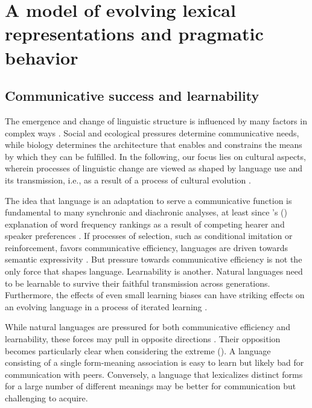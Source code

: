 \documentclass[a4paper, 11pt]{article}
\theoremstyle{Satz}
\newcommand{\citeposs}[2][]{\citeauthor{#2}'s (\citeyear[#1]{#2})}
\begin{document}
\section{A model of evolving lexical representations and pragmatic behavior}
\label{sec:model}

\subsection{Communicative success and learnability}

The emergence and change of linguistic structure is influenced by many factors in complex ways
\citep{benz+etal:2005b,steels:2011,tamariz+kirby:2016}. Social and ecological pressures
determine communicative needs, while biology determines the architecture that enables and
constrains the means by which they can be fulfilled. In the following, our focus lies on
cultural aspects, wherein processes of linguistic change are viewed as shaped by language use
and its transmission, i.e., as a result of a process of cultural evolution
\citep{Pagel2009:Human-Language-,ThompsonKirby2016:Culture-Shapes-}.

The idea that language is an adaptation to serve a communicative function is fundamental to
many synchronic and diachronic analyses, at least since \citeposs{zipf:1949} explanation of
word frequency rankings as a result of competing hearer and speaker preferences \citep[e.g.,
in][]{martinet:1962, horn:1984,jaeger+vRooij:2007,jaeger:2007,
  piantadosi:2014,kirby+etal:2015}. If processes of selection, such as conditional imitation or
reinforcement, favors communicative efficiency, languages are driven towards semantic
expressivity \citep[e.g.,][]{nowak+krakauer:1999,Skyrms2010:Signals}. But pressure towards
communicative efficiency is not the only force that shapes language. Learnability is another.
Natural languages need to be learnable to survive their faithful transmission across
generations. Furthermore, the effects of even small learning biases can have striking effects
on an evolving language in a process of iterated learning
\citep{KirbyHurford2002:The-Emergence-o,SmithKirby2003:Iterated-Learni,kirby+etal:2014}.

While natural languages are pressured for both communicative efficiency and learnability, these forces may
pull in opposite directions \citep[\S7]{christiansen+chater:2008}. Their opposition becomes particularly clear when considering the
extreme (\citealt{kemp+regier:2012,kirby+etal:2015}). A language consisting of a single
form-meaning association is easy to learn but likely bad for communication with peers. Conversely, a language
that lexicalizes distinct forms for a large number of different meanings may be better for communication 
but challenging to acquire.
\end{document}
